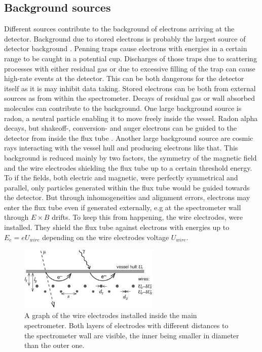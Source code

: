       \subsection{Background sources}
      \label{ch:The KATRIN experiment:sec:Experimental setup:subsec:BackgroundSources}
      Different sources contribute to the background of electrons arriving at the detector. Background due to stored electrons is probably the largest source of detector background \cite{storedElectrons}. Penning traps cause electrons with energies in a certain range to be caught in a potential cup. Discharges of those traps due to scattering processes with either residual gas or due to excessive filling of the trap can cause high-rate events at the detector. This can be both dangerous for the detector itself as it is may inhibit data taking. Stored electrons can be both from external sources as from within the spectrometer. Decays of residual gas or wall absorbed molecules can contribute to the background. One large background source is radon, a neutral particle enabling it to move freely inside the vessel. Radon alpha decays, but shakeoff-, conversion- and auger electrons can be guided to the detector from inside the flux tube \cite{radonGoerhard, radonWandkowsky}.
      Another large background source are cosmic rays interacting with the vessel hull and producing electrons like that. This background is reduced mainly by two factors, the symmetry of the magnetic field and the wire electrodes shielding the flux tube up to a certain threshold energy.
      To if the fields, both electric and magnetic, were perfectly symmetrical and parallel, only particles generated within the flux tube would be guided towards the detector. But through inhomogeneities and alignment errors, electrons may enter the flux tube even if generated externally, e.g at the spectrometer wall through $E\times B$ drifts. To keep this from happening, the wire electrodes, were installed. They shield the flux tube against electrons with energies up to $E_e = eU_{wire}$ depending on the wire electrodes voltage $U_{wire}$. 
      \begin{figure}
		\centering
		\includegraphics[width = 0.6\textwidth]{graphics/katrinExperiment/wireElectrodes.jpg}
		\caption[Wire electrodes]{A graph of the wire electrodes installed inside the main spectrometer. Both layers of electrodes with different distances to the spectrometer wall are visible, the inner being smaller in diameter than the outer one.}
	  \end{figure}